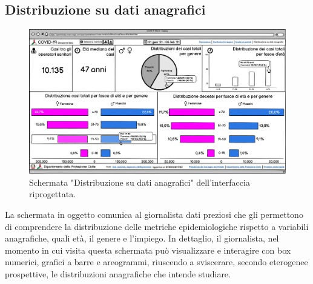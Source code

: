 \documentclass[../../main.tex]{subfiles}
\begin{document}
\subsection{Distribuzione su dati anagrafici}
\begin{figure}[h]
    \centering
    \includegraphics[width = \textwidth]{res/img/1 - Distribuzione su dati anagrafici}
    \caption{Schermata "Distribuzione su dati anagrafici" dell'interfaccia riprogettata.}
    \label{fig:distribuzione-dati-anagrafici}
\end{figure}
La schermata in oggetto comunica al giornalista dati preziosi che gli permettono di comprendere la distribuzione delle metriche epidemiologiche rispetto a variabili anagrafiche, quali età, il genere e l'impiego.
In dettaglio, il giornalista, nel momento in cui visita questa schermata può visualizzare e interagire con box numerici, grafici a barre e areogrammi, riuscendo a sviscerare, secondo eterogenee prospettive, le distribuzioni anagrafiche che intende studiare.
\end{document}
